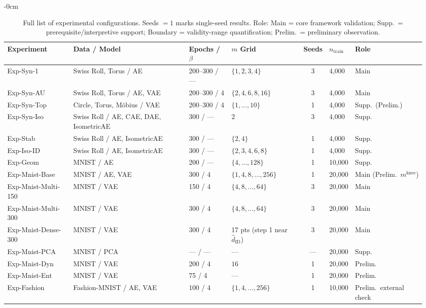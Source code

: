 \documentclass[make,article,submit,pdftex,moreauthors]{Definitions/mdpi}
\newcommand{\mknee}{m^{\mathrm{knee}}}
\begin{document}
\begin{table}[H]
\begin{adjustwidth}{-\extralength}{0cm}
\centering
\caption{Full list of experimental configurations. Seeds $=1$ marks single-seed results. Role: Main = core framework validation; Supp.\ = prerequisite/interpretive support; Boundary = validity-range quantification; Prelim.\ = preliminary observation.}
\label{tab:exp_full}
\footnotesize
\begin{tabular}{p{3.2cm}p{3.3cm}p{2.4cm}p{3.0cm}cp{1.2cm}p{1.8cm}}
\toprule
Experiment & Data / Model & Epochs / $\beta$ & $m$ Grid & Seeds & $n_\mathrm{train}$ & Role \\
\midrule
Exp-Syn-1 & Swiss Roll, Torus / AE & 200--300 / --- & $\{1,2,3,4\}$ & 3 & 4,000 & Main \\
Exp-Syn-AU & Swiss Roll, Torus / AE, VAE & 200--300 / 4 & $\{2,4,6,8,16\}$ & 3 & 4,000 & Main \\
Exp-Syn-Top & Circle, Torus, M\"obius / VAE & 200--300 / 4 & $\{1,\ldots,10\}$ & 1 & 4,000 & Supp.\ (Prelim.) \\
Exp-Syn-Iso & Swiss Roll / AE, CAE, DAE, IsometricAE & 300 / --- & $2$ & 3 & 4,000 & Supp. \\
Exp-Stab & Swiss Roll / AE, IsometricAE & 300 / --- & $\{2,4\}$ & 1 & 4,000 & Supp. \\
Exp-Iso-ID & Swiss Roll / AE, IsometricAE & 300 / --- & $\{2,3,4,6,8\}$ & 1 & 4,000 & Supp. \\
Exp-Geom & MNIST / AE & 200 / --- & $\{4,\ldots,128\}$ & 1 & 10,000 & Supp. \\
Exp-Mnist-Base & MNIST / AE, VAE & 300 / 4 & $\{1,4,8,\ldots,256\}$ & 1 & 20,000 & Main (Prelim.\ $\mknee$) \\
Exp-Mnist-Multi-150 & MNIST / VAE & 150 / 4 & $\{4,8,\ldots,64\}$ & 3 & 20,000 & Main \\
Exp-Mnist-Multi-300 & MNIST / VAE & 300 / 4 & $\{4,8,\ldots,64\}$ & 3 & 20,000 & Main \\
Exp-Mnist-Dense-300 & MNIST / VAE & 300 / 4 & 17 pts (step 1 near $\hat{d}_\mathrm{ID}$) & 3 & 20,000 & Main \\
Exp-Mnist-PCA & MNIST / PCA & --- / --- & --- & --- & 20,000 & Supp. \\
Exp-Mnist-Dyn & MNIST / VAE & 200 / 4 & $16$ & 1 & 20,000 & Prelim. \\
Exp-Mnist-Ent & MNIST / VAE & 75 / 4 & --- & 1 & 20,000 & Prelim. \\
Exp-Fashion & Fashion-MNIST / AE, VAE & 100 / 4 & $\{1,4,\ldots,256\}$ & 1 & 10,000 & Prelim.\ external check \\

\end{tabular}
\end{adjustwidth}
\end{table}
\end{document}
